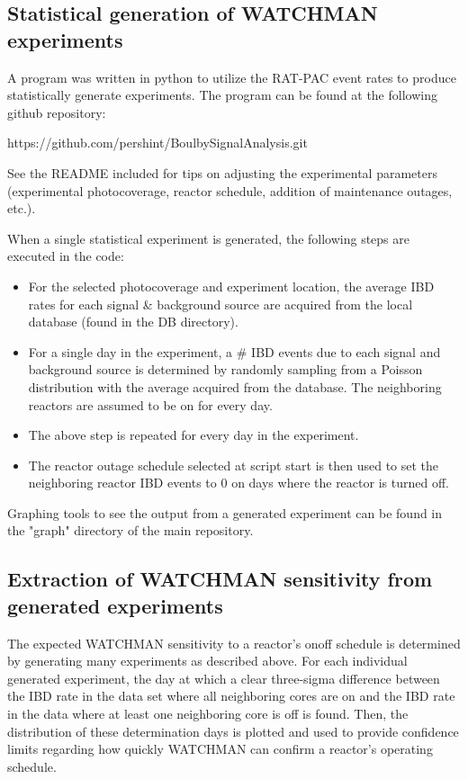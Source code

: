 \documentclass{article}
\begin{document}
\subsection{Statistical generation of WATCHMAN experiments}

A program was written in python to utilize the RAT-PAC event rates to produce
statistically generate experiments. The program can be found at the following
github repository:

\vspace{1cm}
https://github.com/pershint/BoulbySignalAnalysis.git
\vspace{1cm}

See the README included for tips on adjusting the experimental parameters 
(experimental photocoverage, reactor schedule, addition of maintenance outages,
etc.).

When a single statistical experiment is generated, the following steps are
executed in the code:

\begin{itemize}
    \item For the selected photocoverage and experiment location, the average
        IBD rates for each signal & background source are acquired from the
        local database (found in the DB directory).
    \item For a single day in the experiment, a # IBD events due to each signal 
        and background source is determined by randomly sampling from a Poisson
        distribution with the average acquired from the database. The
        neighboring reactors are assumed to be on for every day.
    \item The above step is repeated for every day in the experiment.
    \item The reactor outage schedule selected at script start is then used to
        set the neighboring reactor IBD events to 0 on days where the reactor
        is turned off.
\end{itemize}

Graphing tools to see the output from a generated experiment can be found in
the "graph" directory of the main repository.

\subsection{Extraction of WATCHMAN sensitivity from generated experiments}

The expected WATCHMAN sensitivity to a reactor's on\/off schedule is 
determined by generating many experiments as described above.  For each
individual generated experiment, the day at which a clear three-sigma difference
between the IBD rate in the data set where all neighboring cores are on and
the IBD rate in the data where at least one neighboring core is off is found.
Then, the distribution of these determination
days is plotted and used to provide confidence limits regarding how quickly
WATCHMAN can confirm a reactor's operating schedule.
\end{document}
